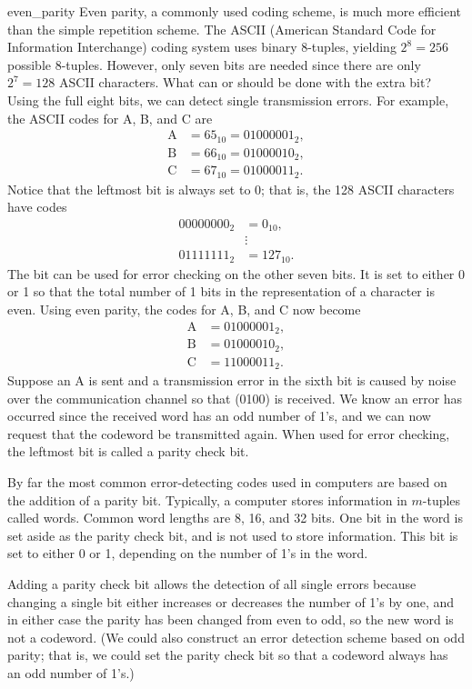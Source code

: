  
\begin{example}{even_parity}
{\bfi Even parity}, a  commonly  used coding scheme, is much
more efficient than the simple repetition scheme. The ASCII (American
Standard Code for Information Interchange) coding system uses binary
8-tuples, yielding $2^{8} = 256$ possible 8-tuples. However, only seven
bits are needed since there are only $2^7 = 128$ ASCII characters.
What can or should be done with the extra bit? Using the full eight
bits, we can detect single transmission errors. For example, the ASCII
codes for A, B, and C are 
\begin{align*}
\mbox{A} & = 65_{10} = 01000001_{2}, \\
\mbox{B} & = 66_{10} = 01000010_{2}, \\
\mbox{C} & = 67_{10} = 01000011_{2}.
\end{align*}
Notice that the leftmost bit is always set to 0; that is, the 128 ASCII
characters have codes 
\begin{align*}
00000000_{2} & = 0_{10}, \\
& \vdots \\
01111111_{2} & = 127_{10}.
\end{align*}
The bit can be used for error checking on the other seven bits. It is
set to either 0 or 1 so that the total number of 1 bits in the
representation of a character is even. Using even parity, the codes
for A, B, and C now become 
\begin{align*}
\mbox{A} & = 01000001_{2}, \\
\mbox{B} & = 01000010_{2}, \\
\mbox{C} & = 11000011_{2}.
\end{align*}
Suppose an A is sent and a transmission error in the sixth
bit is caused by noise over the communication channel so that 
(0100) is received. We know an error has occurred since the
received word has an odd number of 1's, and we can now request that the
codeword be transmitted again. When used for error checking, the
leftmost bit is called a {\bfi parity check bit}.  
 
 
By far the most common error-detecting
codes used in computers are based on the addition of a parity bit.
Typically, a computer stores information in $m$-tuples called {\bfi
words}. Common word lengths are 8, 16, and 32 bits. One bit in the 
word is set aside as the parity check bit, and is not used to store
information. This bit is set to either 0 or 1, depending on the
number of 1's in the word. 
 
 
Adding a parity check bit allows the detection of all single errors
because changing a single bit either increases or decreases the number
of 1's by one, and in either case the parity has been changed from
even to odd, so the new word is not a codeword. (We could also
construct an error detection scheme based on {\bfi odd parity}; that
is, we could set the parity check bit so that a codeword always has an
odd number of 1's.)  
\end{example}
 
